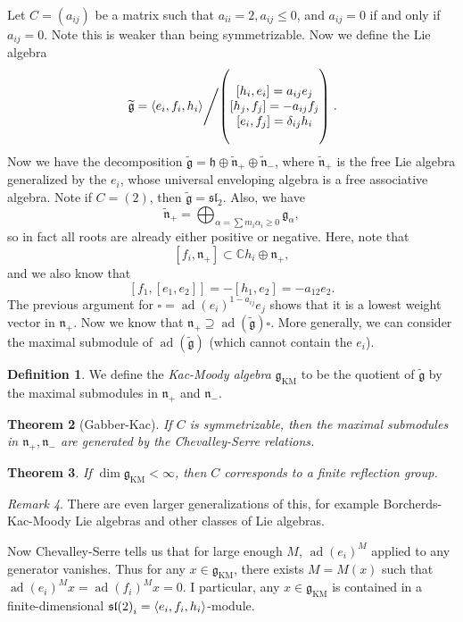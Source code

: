\documentclass[leqno, openany]{memoir}
\newtheorem{thm}{Theorem}[section]
\theoremstyle{definition}
\newtheorem{defn}[thm]{Definition}
\theoremstyle{remark}
\newtheorem{rmk}[thm]{Remark}
\theoremstyle{plain}
\theoremstyle{definition}
\theoremstyle{remark}
\newcommand{\C}{\mathbb{C}}
\newcommand{\mf}[1]{\mathfrak{#1}}
\newcommand{\mr}[1]{\mathrm{#1}}
\newcommand{\wtl}[1]{\widetilde{#1}}
\DeclareMathOperator{\ad}{ad}
\begin{document}
Let $C = (a_{ij})$ be a matrix such that $a_{ii} = 2, a_{ij} \leq 0$, and $a_{ij} = 0$ if and only if $a_{ij} = 0$. Note this is weaker than being symmetrizable. Now we define the Lie algebra
\[ \left. \wtl{\mf{g}} = \ev{e_i, f_i, h_i} \middle/ \qty( \Vectorstack{ {[h_i, e_i] = a_{ij} e_j} {[h_j, f_j] = -a_{ij} f_j} {[e_i, f_j] = \delta_{ij} h_i} } ) \right. . \]
Now we have the decomposition $\wtl{\mf{g}} = \mf{h} \oplus \wtl{\mf{n}}_+ \oplus \wtl{\mf{n}}_-$, where $\wtl{\mf{n}}_+$ is the free Lie algebra generalized by the $e_i$, whose universal enveloping algebra is a free associative algebra. Note if $C = (2)$, then $\wtl{\mf{g}} = \mf{sl}_2$. Also, we have
\[ \wtl{\mf{n}}_+ = \bigoplus_{\alpha = \sum m_i \alpha_i \geq 0} \mf{g}_{\alpha}, \]
so in fact all roots are already either positive or negative. Here, note that
\[ [f_i, \mf{n}_+] \subset \C h_i \oplus \mf{n}_+, \]
and we also know that
\[ [f_1, [e_1, e_2]] = -[h_1, e_2] = -a_{12} e_2. \]
The previous argument for $\square = {\ad(e_i)}^{1-a_{ij}} e_j$ shows that it is a lowest weight vector in $\mf{n}_+$. Now we know that $\mf{n}_+ \supseteq \ad(\wtl{\mf{g}}) \square$. More generally, we can consider the maximal submodule of $\ad(\wtl{\mf{g}})$ (which cannot contain the $e_i$). 

\begin{defn}
    We define the \textit{Kac-Moody algebra} $\mf{g}_{\mr{KM}}$ to be the quotient of $\wtl{\mf{g}}$ by the maximal submodules in $\mf{n}_+$ and $\mf{n}_-$.
\end{defn}

\begin{thm}[Gabber-Kac]
    If $C$ is symmetrizable, then the maximal submodules in $\mf{n}_+, \mf{n}_-$ are generated by the Chevalley-Serre relations.
\end{thm}

\begin{thm}
    If $\dim \mf{g}_{\mr{KM}} < \infty$, then $C$ corresponds to a finite reflection group.
\end{thm}

\begin{rmk}
    There are even larger generalizations of this, for example Borcherds-Kac-Moody Lie algebras and other classes of Lie algebras. 
\end{rmk}

Now Chevalley-Serre tells us that for large enough $M$, ${\ad(e_i)}^M$ applied to any generator vanishes. Thus for any $x \in \mf{g}_{\mr{KM}}$, there exists $M = M(x)$ such that ${\ad(e_i)}^M x = {\ad(f_i)}^M x = 0$. I particular, any $x \in \mf{g}_{\mr{KM}}$ is contained in a finite-dimensional ${\mf{sl}(2)}_i = \ev{e_i, f_i, h_i}$-module.
\end{document}
